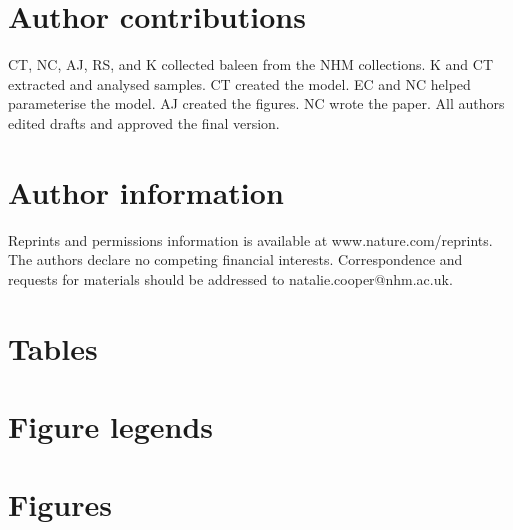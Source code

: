 \documentclass[a4paper,12pt]{article}
\begin{document}
\section{Author contributions}
CT, NC, AJ, RS, and K collected baleen from the NHM collections. 
K and CT extracted and analysed samples.
CT created the model.
EC and NC helped parameterise the model.
AJ created the figures. 
NC wrote the paper.
All authors edited drafts and approved the final version.

\section{Author information}
Reprints and permissions information is available at www.nature.com/reprints.
The authors declare no competing financial interests.
Correspondence and requests for materials should be addressed to natalie.cooper@nhm.ac.uk.

\section{Tables}

\section{Figure legends}


\newpage
\section{Figures}

\end{document}
